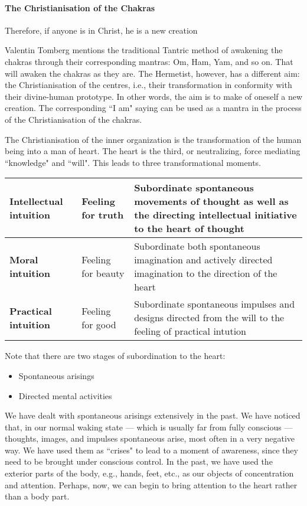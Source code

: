 \paragraph{The Christianisation of the Chakras}
\begin{quotex}
Therefore, if anyone is in Christ, he is a new creation 

\end{quotex}
Valentin Tomberg mentions the traditional Tantric method of awakening the chakras through their corresponding mantras: Om, Ham, Yam, and so on. That will awaken the chakras as they are. The Hermetist, however, has a different aim: the Christianisation of the centres, i.e., their transformation in conformity with their divine-human prototype. In other words, the aim is to make of oneself a new creation. The corresponding ``I am" saying can be used as a mantra in the process of the Christianisation of the chakras.

The Christianisation of the inner organization is the transformation of the human being into a man of heart. The heart is the third, or neutralizing, force mediating ``knowledge" and ``will". This leads to three transformational moments.

\begin{table}[h]
\begin{tabularx}{\textwidth}{llX}\toprule
\textbf{Intellectual intuition} &
Feeling for truth &
Subordinate spontaneous movements of thought as well as the directing intellectual initiative to the heart of thought\\\midrule
\textbf{Moral intuition} &
Feeling for beauty &
Subordinate both spontaneous imagination and actively directed imagination to the direction of the heart\\\midrule
\textbf{Practical intuition} &
Feeling for good &
Subordinate spontaneous impulses and designs directed from the will to the feeling of practical intution\\\bottomrule
\end{tabularx}
\end{table}
Note that there are two stages of subordination to the heart:

\begin{itemize}
\item Spontaneous arisings 
\item Directed mental activities 
\end{itemize}
We have dealt with spontaneous arisings extensively in the past. We have noticed that, in our normal waking state — which is usually far from fully conscious — thoughts, images, and impulses spontaneous arise, most often in a very negative way. We have used them as ``crises" to lead to a moment of awareness, since they need to be brought under conscious control. In the past, we have used the exterior parts of the body, e.g., hands, feet, etc., as our objects of concentration and attention. Perhaps, now, we can begin to bring attention to the heart rather than a body part.

